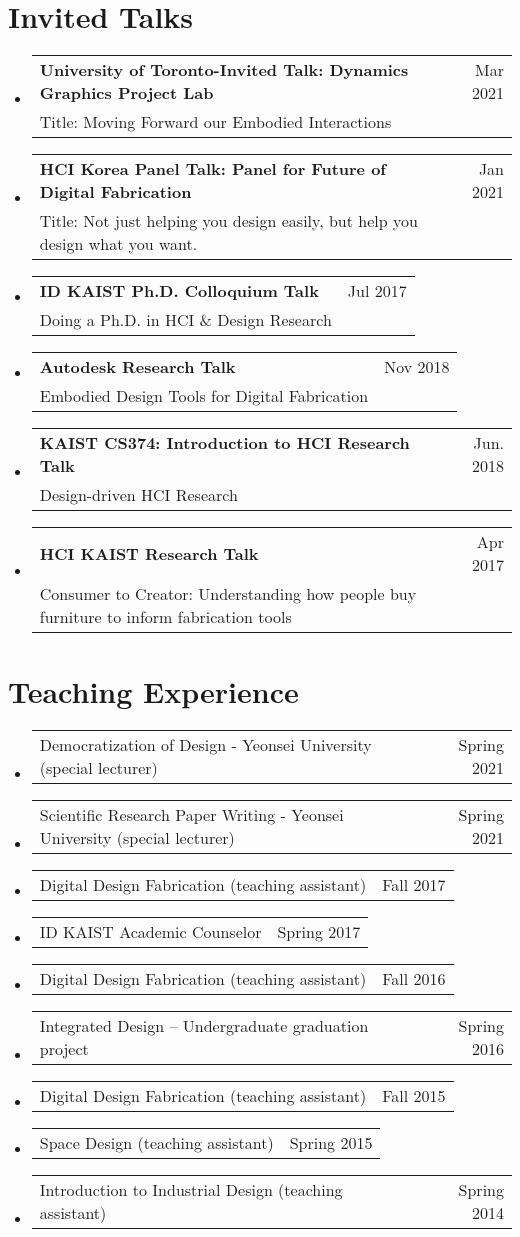 \documentclass[letterpaper,11pt]{article} %
\makeatletter
\newcommand{\CVSubheading}[4]{
  \vspace{-2pt}\item
    \begin{tabular*}{0.97\textwidth}[t]{l@{\extracolsep{\fill}}r}
      \textbf{#1} & #2 \\
      \small#3 & \small #4 \\
    \end{tabular*}\vspace{-7pt}
}
\newcommand{\CVSubSubheading}[2]{
    \item
    \begin{tabular*}{0.97\textwidth}{l@{\extracolsep{\fill}}r}
      \small{#1} & #2 \\
    \end{tabular*}\vspace{-7pt}
}
\newcommand{\CVSubHeadingListStart}{\begin{itemize}[leftmargin=0.5cm, label={}]}
\newcommand{\CVSubHeadingListEnd}{\end{itemize}}
\makeatother
\begin{document}
\section{Invited Talks}
  \CVSubHeadingListStart
    \CVSubheading
      {University of Toronto-Invited Talk: Dynamics Graphics Project Lab}{Mar 2021}
      {Title: Moving Forward our Embodied Interactions}{}
    \CVSubheading
      {HCI Korea Panel Talk: Panel for Future of Digital Fabrication}{Jan 2021}
      {Title: Not just helping you design easily, but help you design what you want.}{}
    \CVSubheading
      {ID KAIST Ph.D. Colloquium Talk}{Jul 2017}
      {Doing a Ph.D. in HCI \& Design Research}{}
    \CVSubheading
      {Autodesk Research Talk}{Nov 2018}
      {Embodied Design Tools for Digital Fabrication}{}
    \CVSubheading
      {KAIST CS374: Introduction to HCI Research Talk}{Jun. 2018}
      {Design-driven HCI Research}{}
    \CVSubheading
      {HCI KAIST Research Talk}{Apr 2017}
      {Consumer to Creator: Understanding how people buy furniture to inform fabrication tools}{}
  \CVSubHeadingListEnd


\begin{comment}
Section is here as it applied to my application for positions in academia. 
Remember to tailor the resume for to the position.
\end{comment}

\section{Teaching Experience}
  \CVSubHeadingListStart
    \CVSubSubheading
      {Democratization of Design - Yeonsei University (special lecturer)}{Spring 2021}
    \CVSubSubheading
      {Scientific Research Paper Writing - Yeonsei University (special lecturer)}{Spring 2021}
    \CVSubSubheading
      {Digital Design Fabrication (teaching assistant)}{Fall 2017}
    \CVSubSubheading
      {ID KAIST Academic Counselor}{Spring 2017}
    \CVSubSubheading
      {Digital Design Fabrication (teaching assistant)}{Fall 2016}
    \CVSubSubheading
      {Integrated Design – Undergraduate graduation project}{Spring 2016}
    \CVSubSubheading
      {Digital Design Fabrication (teaching assistant)}{Fall 2015}
    \CVSubSubheading
      {Space Design (teaching assistant)}{Spring 2015}
    \CVSubSubheading
      {Introduction to Industrial Design (teaching assistant)}{Spring 2014}
  \CVSubHeadingListEnd
\end{document}
